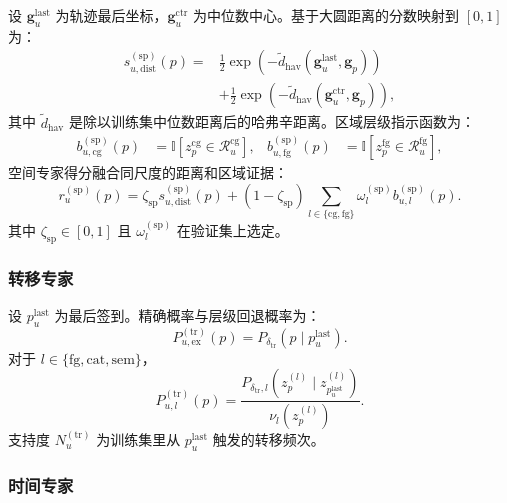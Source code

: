 \documentclass[10pt,fontset=none,twocolumn]{ctexart}
\newcommand{\Ind}{\mathbb{I}}
\begin{document}
设 $\bm{g}_{u}^{\mathrm{last}}$ 为轨迹最后坐标，$\bm{g}_{u}^{\mathrm{ctr}}$ 为中位数中心。基于大圆距离的分数映射到 $[0,1]$ 为：
\begin{equation}
\begin{aligned}
s_{u,\mathrm{dist}}^{(\mathrm{sp})}(p)
={}&\frac{1}{2}\exp\!\left(-\widetilde d_{\mathrm{hav}}
(\bm{g}_{u}^{\mathrm{last}},\bm{g}_{p})\right)\\
&+\frac{1}{2}\exp\!\left(-\widetilde d_{\mathrm{hav}}
(\bm{g}_{u}^{\mathrm{ctr}},\bm{g}_{p})\right),
\end{aligned}
\label{eq:spatial_exact}
\end{equation}
其中 $\widetilde d_{\mathrm{hav}}$ 是除以训练集中位数距离后的哈弗辛距离。区域层级指示函数为：
\begin{align}
b_{u,\mathrm{cg}}^{(\mathrm{sp})}(p)
&=
\Ind[z_p^{\mathrm{cg}}\in\mathcal{R}_{u}^{\mathrm{cg}}],
&
b_{u,\mathrm{fg}}^{(\mathrm{sp})}(p)
&=
\Ind[z_p^{\mathrm{fg}}\in\mathcal{R}_{u}^{\mathrm{fg}}],
\label{eq:spatial_backoff}
\end{align}
空间专家得分融合同尺度的距离和区域证据：
\begin{equation}
r_u^{(\mathrm{sp})}(p)
=
\zeta_{\mathrm{sp}}s_{u,\mathrm{dist}}^{(\mathrm{sp})}(p)
+
(1-\zeta_{\mathrm{sp}})
\sum_{l\in\{\mathrm{cg},\mathrm{fg}\}}
\omega_l^{(\mathrm{sp})}b_{u,l}^{(\mathrm{sp})}(p).
\label{eq:spatial_fusion}
\end{equation}
其中 $\zeta_{\mathrm{sp}}\in[0,1]$ 且 $\omega_l^{(\mathrm{sp})}$ 在验证集上选定。

\subsubsection{转移专家}

设 $p_u^{\mathrm{last}}$ 为最后签到。精确概率与层级回退概率为：
\begin{equation}
P_{u,\mathrm{ex}}^{(\mathrm{tr})}(p)
=
P_{\delta_{\mathrm{tr}}}(p\mid p_u^{\mathrm{last}}).
\label{eq:transition_exact}
\end{equation}
对于 $l\in\{\mathrm{fg},\mathrm{cat},\mathrm{sem}\}$，
\begin{equation}
P_{u,l}^{(\mathrm{tr})}(p)
=
\frac{
P_{\delta_{\mathrm{tr}},l}
(z_p^{(l)}\mid z_{p_u^{\mathrm{last}}}^{(l)})
}{
\nu_l(z_p^{(l)})
}.
\label{eq:transition_backoff}
\end{equation}
支持度 $N_u^{(\mathrm{tr})}$ 为训练集里从 $p_u^{\mathrm{last}}$ 触发的转移频次。

\subsubsection{时间专家}
\end{document}
